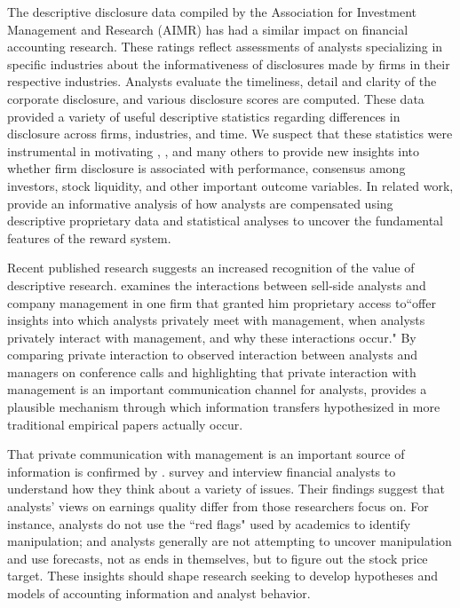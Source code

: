 \documentclass[12pt,reqno,titlepage]{amsart}
\begin{document}
\begin{doublespace}
The descriptive disclosure data compiled by the Association for Investment Management and Research (AIMR) has had a similar impact on financial accounting research. 
These ratings reflect assessments of analysts specializing in specific industries about the informativeness of disclosures made by firms in their respective industries.
Analysts evaluate the timeliness, detail and clarity of the corporate disclosure, and various disclosure scores are computed. 
These data provided a variety of useful descriptive statistics regarding differences in disclosure across firms, industries, and time.
We suspect that these statistics were instrumental in motivating \citet{Lang:1993iv,Lang:1996dk}, \cite{Healy:1999ig}, and many others to provide new insights into whether firm disclosure is associated with performance, consensus among investors, stock liquidity, and other important outcome variables.
In related work, \cite{Groysberg:2011dk} provide an informative analysis of how analysts are compensated using descriptive proprietary data and statistical analyses to uncover the fundamental features of the reward system.

Recent published research suggests an increased recognition of the value of descriptive research. 
\citet{Soltes:2013ba} examines the interactions between sell-side analysts and company management in one firm that granted him proprietary access to``offer insights into which analysts privately meet with management, when analysts privately interact with management, and why these interactions occur."
By comparing private interaction to observed interaction between analysts and managers on conference calls and highlighting that private interaction with management is an important communication channel for analysts, \citet{Soltes:2013ba} provides a plausible mechanism through which information transfers hypothesized in more traditional empirical papers actually occur. 

That private communication with management is an important source of information is confirmed by \citet{Brown:2015kd}. 
\citet{Brown:2015kd} survey and interview financial analysts to understand how they think about a variety of issues. 
Their findings suggest that analysts' views on earnings quality differ from those researchers focus on. 
For instance, analysts do not use the ``red flags" used by academics to identify manipulation; and analysts generally are not attempting to uncover manipulation and use forecasts, not as ends in themselves, but to figure out the stock price target. 
These insights should shape research seeking to develop hypotheses and models of accounting information and analyst behavior. 


\end{doublespace}
\end{document}
